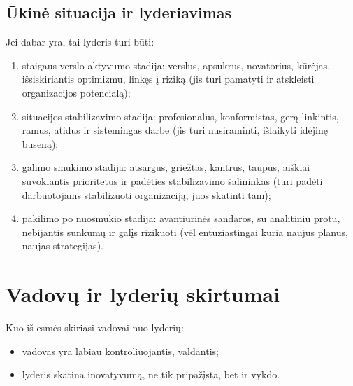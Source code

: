 \subsection{Ūkinė situacija ir lyderiavimas}

Jei dabar yra, tai lyderis turi būti:
\begin{enumerate}
  \item staigaus verslo aktyvumo stadija: verslus, apsukrus, novatorius,
    kūrėjas, išsiskiriantis optimizmu, linkęs į riziką (jis turi pamatyti
    ir atskleisti organizacijos potencialą);
  \item situacijos stabilizavimo stadija: profesionalus, konformistas,
    gerą linkintis, ramus, atidus ir sistemingas darbe (jis turi 
    nusiraminti, išlaikyti idėjinę būseną);
  \item galimo smukimo stadija: atsargus, griežtas, kantrus, taupus,
    aiškiai suvokiantis prioritetus ir padėties stabilizavimo šalininkas
    (turi padėti darbuotojams stabilizuoti organizaciją, juos skatinti
    tam);
  \item pakilimo po nuosmukio stadija: avantiūrinės sandaros, su
    analitiniu protu, nebijantis sunkumų ir galįs rizikuoti
    (vėl entuziastingai kuria naujus planus, naujas strategijas).
\end{enumerate}

\section{Vadovų ir lyderių skirtumai}


Kuo iš esmės skiriasi vadovai nuo lyderių:
\begin{itemize}
  \item vadovas yra labiau kontroliuojantis, valdantis;
  \item lyderis skatina inovatyvumą, ne tik pripažįsta, bet ir vykdo.
\end{itemize}
